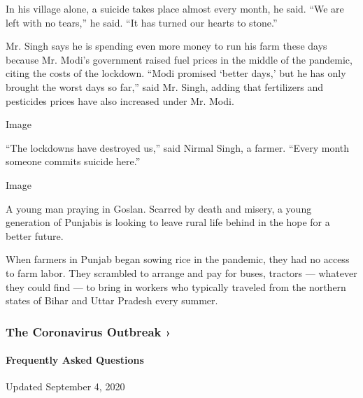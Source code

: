 In his village alone, a suicide takes place almost every month, he said.
``We are left with no tears,'' he said. ``It has turned our hearts to
stone.''

Mr. Singh says he is spending even more money to run his farm these days
because Mr. Modi's government raised fuel prices in the middle of the
pandemic, citing the costs of the lockdown. ``Modi promised `better
days,' but he has only brought the worst days so far,'' said Mr. Singh,
adding that fertilizers and pesticides prices have also increased under
Mr. Modi.

Image

``The lockdowns have destroyed us,'' said Nirmal Singh, a farmer.
``Every month someone commits suicide here.''

Image

A young man praying in Goslan. Scarred by death and misery, a young
generation of Punjabis is looking to leave rural life behind in the hope
for a better future.~

When farmers in Punjab began sowing rice in the pandemic, they had no
access to farm labor. They scrambled to arrange and pay for buses,
tractors --- whatever they could find --- to bring in workers who
typically traveled from the northern states of Bihar and Uttar Pradesh
every summer.

\href{https://www.nytimes3xbfgragh.onion/news-event/coronavirus?action=click\&pgtype=Article\&state=default\&region=MAIN_CONTENT_3\&context=storylines_faq}{}

\hypertarget{the-coronavirus-outbreak-}{%
\subsubsection{The Coronavirus Outbreak
›}\label{the-coronavirus-outbreak-}}

\hypertarget{frequently-asked-questions}{%
\paragraph{Frequently Asked
Questions}\label{frequently-asked-questions}}

Updated September 4, 2020


